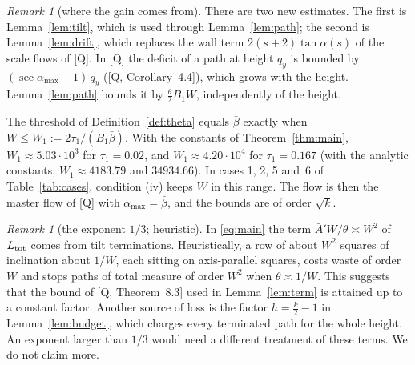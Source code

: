 \documentclass[11pt]{amsart}
\newcommand{\amax}{\alpha_{\max}}
\newcommand{\bbar}{\bar\beta}
\theoremstyle{definition}
\theoremstyle{remark}
\newtheorem{remark}[theorem]{Remark}
\numberwithin{equation}{section}
\begin{document}
\begin{remark}[where the gain comes from]
There are two new estimates. The first is Lemma~\ref{lem:tilt}, which is used through Lemma~\ref{lem:path}; the
second is Lemma~\ref{lem:drift}, which replaces the wall term $2(s+2)\tan\alpha(s)$ of the scale flows of [Q]. In [Q] the deficit of a path at height $q_y$ is
bounded by $(\sec\amax-1)\,q_y$ ([Q, Corollary~4.4]), which grows with the height. Lemma~\ref{lem:path} bounds it by
$\frac\theta2B_1W$, independently of the height.

The threshold of Definition~\ref{def:theta} equals $\bbar$ exactly when $W\le W_1:=2\tau_1/(B_1\bbar)$. With the
constants of Theorem~\ref{thm:main}, $W_1\approx5.03\cdot10^3$ for $\tau_1=0.02$, and $W_1\approx4.20\cdot10^4$ for
$\tau_1=0.167$ (with the analytic constants, $W_1\approx4183.79$ and $34934.66$). In cases 1, 2, 5 and~6 of Table~\ref{tab:cases}, condition (iv) keeps $W$ in this range. The flow is
then the master flow of [Q] with $\amax=\bbar$, and the bounds are of order $\sqrt k$.
\end{remark}

\begin{remark}[the exponent $1/3$; heuristic]
In \eqref{eq:main} the term $\bar A'W/\theta\asymp W^2$ of $L_{\rm tot}$ comes from tilt terminations. Heuristically,
a row of about $W^2$ squares of inclination about $1/W$, each sitting on axis-parallel squares, costs waste of order $W$
and stops paths of total measure of order $W^2$ when $\theta\asymp1/W$. This suggests that the bound of
[Q, Theorem~8.3] used in Lemma~\ref{lem:term} is attained up to a constant factor. Another source of loss is the factor
$h=\frac k2-1$ in Lemma~\ref{lem:budget}, which charges every terminated path for the whole height. An exponent larger
than $1/3$ would need a different treatment of these terms. We do not claim more.
\end{remark}
\end{document}
